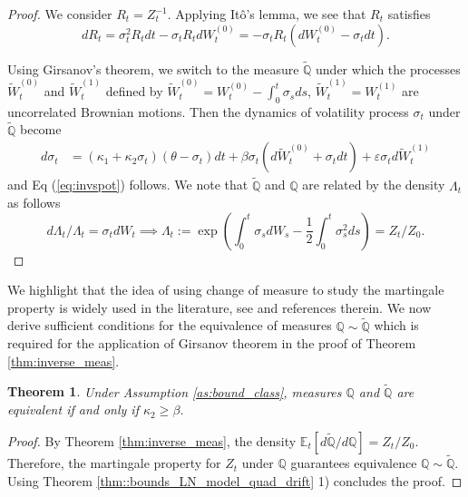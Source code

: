 \documentclass[pdftex,11pt,a4paper] {article}
\newtheorem{theorem}{Theorem}[section]
\begin{document}
\begin{proof}
We consider $R_{t} = Z^{-1}_{t}$. Applying It\^{o}'s lemma, we see that $R_{t}$ satisfies 
\begin{equation*}
dR_t=\sigma_t^2 R_t  dt -\sigma_t R_t dW_t^{(0)}=
-\sigma_t R_t(dW_t^{(0)}-\sigma_tdt).
\end{equation*}

Using Girsanov's theorem, we switch to the measure $\mathbb{\tilde{Q}}$ under which the processes $\widetilde W^{(0)}_{t}$ and $\widetilde W^{(1)}_{t}$ defined by $\widetilde W^{(0)}_{t}= W^{(0)}_{t}-\int_0^t \sigma_sds$, $\widetilde W^{(1)}_{t}= W^{(1)}_{t}$ are uncorrelated Brownian motions. Then the dynamics of volatility process $\sigma_t$ under $\mathbb{\tilde{Q}}$ become
\begin{equation} \label {eq:svmd1_rev}
\begin{split}
d\sigma_{t}& =\left(\kappa_{1} + \kappa_{2}\sigma_{t} \right)(\theta - \sigma_{t})dt+  \beta  \sigma_{t}\left(d\widetilde W^{(0)}_{t}+\sigma_tdt\right)+  \varepsilon \sigma_{t} d\widetilde W^{(1)}_{t}
\end{split}
\end{equation}
and Eq (\ref{eq:invspot}) follows. We note that $\tilde{\mathbb{Q}}$ and $\mathbb{Q}$ are related by the density $\Lambda_t$ as follows
\begin{equation}\label{eq:density_process}
d\Lambda_t/\Lambda_t=\sigma_tdW_t  \implies 
\Lambda_t:= \exp\left(\int_0^t\sigma_s dW_s-\frac{1}{2}\int_0^t\sigma_s^2ds\right)=Z_t/Z_0. 
\end{equation}
\end{proof}

We highlight that the idea of using change of measure to study the martingale property is widely used in the literature, see \cite{Ruf2015} and references therein. We now derive sufficient conditions for the equivalence of measures $\mathbb{Q}\sim \tilde{\mathbb{Q}}$ which is required for the application of Girsanov theorem in the proof of Theorem \ref{thm:inverse_meas}. 

\begin{theorem}\label{thm::meas_equiv_quad_drift}
Under Assumption \ref{as:bound_class}, measures $\mathbb{Q}$ and $\tilde{\mathbb{Q}}$ are equivalent if and only if $\kappa_2\ge \beta$. 
\end{theorem}
\begin{proof}
By Theorem \ref{thm:inverse_meas}, the density $\mathbb{E}_t\left[d\tilde{\mathbb{Q}}/d\mathbb{Q}\right]=Z_t/Z_0$. Therefore, the martingale property for $Z_t$ under $\mathbb{Q}$ guarantees equivalence $\mathbb{Q}\sim \tilde{\mathbb{Q}}$. Using Theorem \ref{thm::bounds_LN_model_quad_drift} 1) concludes the proof. 
\end{proof}
\end{document}
